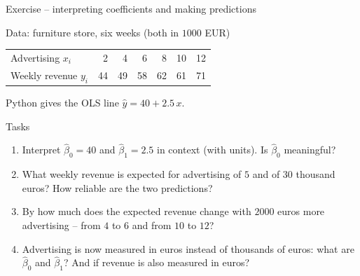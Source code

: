 \documentclass[aspectratio=169,11pt]{beamer}
\begin{document}
\begin{frame}{Exercise -- interpreting coefficients and making predictions}
  \small
  \begin{block}{Data: furniture store, six weeks (both in $1000$ EUR)}
    \vspace{-2pt}
    \begin{center}
      \renewcommand{\arraystretch}{1.05}
      \begin{tabular}{l*{6}{r}}
        \toprule
        Advertising $x_i$ & 2  & 4  & 6  & 8  & 10 & 12 \\
        Weekly revenue $y_i$  & 44 & 49 & 58 & 62 & 61 & 71 \\
        \bottomrule
      \end{tabular}
    \end{center}
    \vspace{-6pt}
    Python gives the OLS line $\hat{y} = 40 + 2.5\,x$.
  \end{block}

  \begin{exampleblock}{Tasks}
    \begin{enumerate}
      \setlength{\itemsep}{2pt}
      \item Interpret $\hat{\beta}_0 = 40$ and $\hat{\beta}_1 = 2.5$ in
            context (with units). Is $\hat{\beta}_0$ meaningful?
      \item What weekly revenue is expected for advertising of $5$ and of
            $30$ thousand euros? How reliable are the two predictions?
      \item By how much does the expected revenue change with $2000$ euros
            more advertising -- from $4$ to $6$ and from $10$ to $12$?
      \item Advertising is now measured in euros instead of thousands of euros: what
            are $\hat{\beta}_0$ and $\hat{\beta}_1$? And if revenue is also
            measured in euros?
    \end{enumerate}
  \end{exampleblock}
\end{frame}
\end{document}
